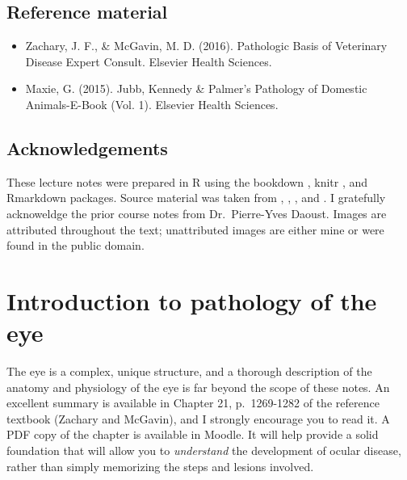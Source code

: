 \documentclass[openany]{article}
\providecommand{\tightlist}{%
  \setlength{\itemsep}{0pt}\setlength{\parskip}{0pt}}
\begin{document}
\subsection*{Reference material}\label{reference-material}

\begin{itemize}
\tightlist
\item
  Zachary, J. F., \& McGavin, M. D. (2016). Pathologic Basis of
  Veterinary Disease Expert Consult. Elsevier Health Sciences.
\item
  Maxie, G. (2015). Jubb, Kennedy \& Palmer's Pathology of Domestic
  Animals-E-Book (Vol. 1). Elsevier Health Sciences.
\end{itemize}

\subsection*{Acknowledgements}\label{acknowledgements}

These lecture notes were prepared in R \citep{R-base} using the bookdown
\citep{xie2015}, knitr \citep{R-knitr}, and Rmarkdown
\citep{R-rmarkdown} packages. Source material was taken from
\citet{zachary2016pathologic}, \citet{dubielzig}, \citet{histobasis},
and \citet{maxie2015jubb}. I gratefully acknoweldge the prior course
notes from Dr.~Pierre-Yves Daoust. Images are attributed throughout the
text; unattributed images are either mine or were found in the public
domain.

\section{Introduction to pathology of the eye}\label{intro}

The eye is a complex, unique structure, and a thorough description of
the anatomy and physiology of the eye is far beyond the scope of these
notes. An excellent summary is available in Chapter 21, p.~1269-1282 of
the reference textbook (Zachary and McGavin), and I strongly encourage
you to read it. A PDF copy of the chapter is available in Moodle. It
will help provide a solid foundation that will allow you to
\emph{understand} the development of ocular disease, rather than simply
memorizing the steps and lesions involved.
\end{document}
